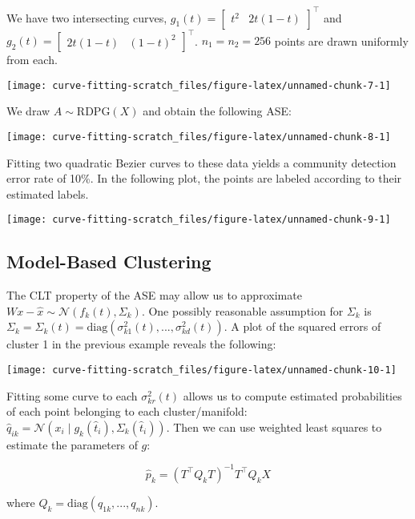 \documentclass[
  11pt,
]{article}
\begin{document}
\begin{example}



We have two intersecting curves, $g_1(t) = \begin{bmatrix} t^2 & 2 t (1 - t) \end{bmatrix}^\top$ and $g_2(t) = \begin{bmatrix} 2 t (1 - t) & (1 - t) ^ 2 \end{bmatrix}^\top$. $n_1 = n_2 = 256$ points are drawn uniformly from each.


\begin{center}\texttt{[image: curve-fitting-scratch\_files/figure-latex/unnamed-chunk-7-1]} \end{center}

We draw $A \sim \mathrm{RDPG}(X)$ and obtain the following ASE:


\begin{center}\texttt{[image: curve-fitting-scratch\_files/figure-latex/unnamed-chunk-8-1]} \end{center}

Fitting two quadratic Bezier curves to these data yields a community detection error rate of 10\%. 
In the following plot, the points are labeled according to their estimated labels.


\begin{center}\texttt{[image: curve-fitting-scratch\_files/figure-latex/unnamed-chunk-9-1]} \end{center}

\end{example}

\hypertarget{model-based-clustering}{%
\subsection{Model-Based Clustering}\label{model-based-clustering}}

The CLT property of the ASE may allow us to approximate
\(W x - \hat{x} \sim \mathcal{N}(f_k(t), \Sigma_k)\). One possibly
reasonable assumption for \(\Sigma_k\) is
\(\Sigma_k = \Sigma_k(t) = \mathrm{diag}(\sigma_{k1}^2(t), ..., \sigma_{kd}^2(t))\).
A plot of the squared errors of cluster 1 in the previous example
reveals the following:

\begin{center}\texttt{[image: curve-fitting-scratch\_files/figure-latex/unnamed-chunk-10-1]} \end{center}

Fitting some curve to each \(\sigma_{kr}^2(t)\) allows us to compute
estimated probabilities of each point belonging to each
cluster/manifold:
\(\hat{q}_{ik} = \mathcal{N}(x_i \mid g_k(\hat{t}_i), \Sigma_k(\hat{t}_i))\).
Then we can use weighted least squares to estimate the parameters of
\(g\):

\[\hat{p}_k = (T^\top Q_k T)^{-1} T^\top Q_k X\]

where \(Q_k = \mathrm{diag}(q_{1k}, ..., q_{nk})\).

  
\end{document}
